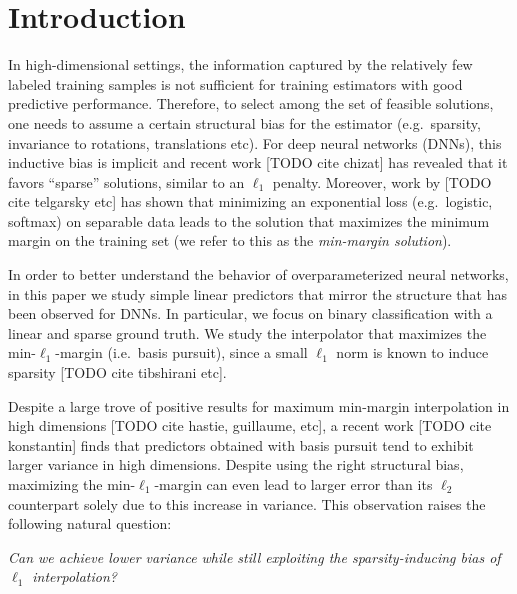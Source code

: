 \section{Introduction}

In high-dimensional settings, the information captured by the relatively few
labeled training samples is not sufficient for training estimators with good
predictive performance. Therefore, to select among the set of feasible
solutions, one needs to assume a certain structural bias for the estimator
(e.g.\ sparsity, invariance to rotations, translations etc).
For deep neural networks (DNNs), this inductive bias is implicit and recent work [TODO
cite chizat] has revealed that it favors ``sparse'' solutions, similar to an
$\ell_1$ penalty. Moreover, work by [TODO cite telgarsky etc] has shown that
minimizing an exponential loss (e.g.\ logistic, softmax) on separable data leads
to the solution that maximizes the minimum margin on the training set (we refer
to this as the \emph{min-margin solution}).

In order to better understand the behavior of overparameterized neural networks,
in this paper we study simple linear predictors that mirror the structure that
has been observed for DNNs. In particular, we focus on binary classification
with a linear and sparse ground truth. We study the interpolator that maximizes
the min-$\ell_1$-margin (i.e.\ basis pursuit), since a small $\ell_1$ norm is
known to induce sparsity [TODO cite tibshirani etc].

Despite a large trove of positive results for maximum min-margin interpolation
in high dimensions [TODO cite hastie, guillaume, etc], a recent work [TODO cite
konstantin] finds that predictors obtained with basis pursuit tend to exhibit
larger variance in high dimensions. Despite using the right structural bias,
maximizing the min-$\ell_1$-margin can even lead to larger error than its
$\ell_2$ counterpart solely due to this increase in variance. This observation
raises the following natural question:

\begin{center}

\emph{Can we achieve lower variance while still exploiting the sparsity-inducing
bias of $\ell_1$ interpolation?}

\end{center}

